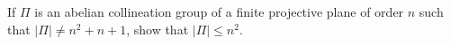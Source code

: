 If $\Pi$ is an abelian collineation group of a finite projective plane of order $n$ such that $|\Pi| \neq n^2 + n + 1$, show that $|\Pi| \leq n^2$.
